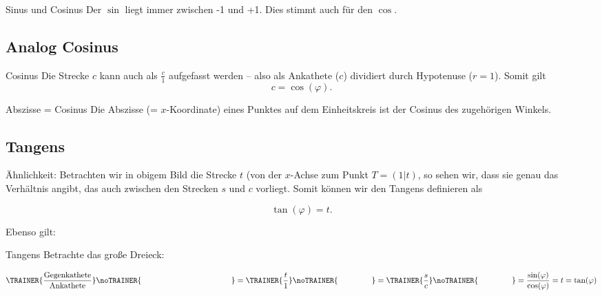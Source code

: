 \begin{bemerkung}{Sinus und Cosinus}{}
Der $\sin{}$ liegt immer zwischen -1 und
+1. Dies stimmt auch für den $\cos$\-.
\end{bemerkung}


\newpage

\subsection{Analog Cosinus}




\begin{bemerkung}{Cosinus}{}
  Die Strecke $c$ kann auch als $\frac{c}1$ aufgefasst werden -- also
  als Ankathete ($c$) dividiert durch Hypotenuse ($r=1$). Somit
  gilt
  $$c = \cos(\varphi).$$
\end{bemerkung}

\begin{bemerkung}{Abszisse = Cosinus}{}
  Die Abszisse (= $x$-Koordinate) eines Punktes auf dem Einheitskreis ist
  der Cosinus des zugehörigen Winkels.
\end{bemerkung}

\newpage
\subsection{Tangens}




Ähnlichkeit: 
Betrachten wir in obigem Bild die Strecke $t$ (von der $x$-Achse zum
Punkt $T=(1|t)$, so sehen wir, dass sie genau das Verhältnis angibt, das
auch zwischen den Strecken $s$ und $c$ vorliegt. 
Somit können wir den Tangens definieren als

$$\tan(\varphi) = t.$$

Ebenso gilt:
\begin{gesetz}{Tangens}{} Betrachte das große Dreieck:
  
  $$\TRAINER{\frac{\text{Gegenkathete}}{\text{Ankathete}}}\noTRAINER{\hspace{40mm}}
  =  \TRAINER{\frac{t}1}\noTRAINER{\hspace{15mm}} =
  \TRAINER{\frac{s}{c}}\noTRAINER{\hspace{15mm}} =
\frac{\sin(\varphi)}{\cos(\varphi)} = t =  
  \tan(\varphi) $$
\end{gesetz}
\newpage

